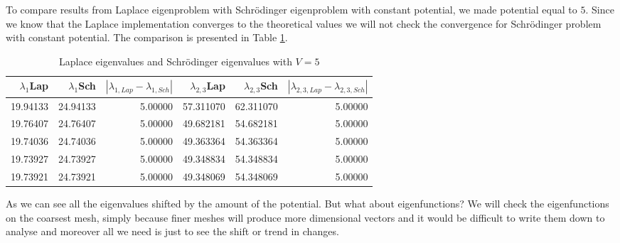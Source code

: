 \documentclass[conference]{IEEEtran}
\begin{document}
To compare results from Laplace eigenproblem with Schr\"{o}dinger eigenproblem with constant potential, we made potential equal to $5$. Since we know that the Laplace implementation converges to the theoretical values we will not check the convergence for Schr\"{o}dinger problem with constant potential.
The comparison is presented in Table \ref{tab:Laplace vs Schrod}.
\begin{table}[H]
    \centering
    \caption{Laplace eigenvalues and Schr\"{o}dinger eigenvalues with $V=5$}
    \label{tab:Laplace vs Schrod}
    \begin{tabular}{rrrrrr}
        \toprule
        $\lambda_1$Lap & $\lambda_1$Sch & $|\lambda_{1,Lap} - \lambda_{1,Sch}|$ & $\lambda_{2,3}$Lap & $\lambda_{2,3}$Sch & $|\lambda_{2,3,Lap} - \lambda_{2,3,Sch}|$ \\
        \midrule
        19.94133 & 24.94133 & 5.00000 & 57.311070 & 62.311070 & 5.00000 \\
        19.76407 & 24.76407 & 5.00000 & 49.682181 & 54.682181 & 5.00000 \\
        19.74036 & 24.74036 & 5.00000 & 49.363364 & 54.363364 & 5.00000 \\
        19.73927 & 24.73927 & 5.00000 & 49.348834 & 54.348834 & 5.00000 \\
        19.73921 & 24.73921 & 5.00000 & 49.348069 & 54.348069 & 5.00000 \\

        \bottomrule
    \end{tabular}
\end{table}

As we can see all the eigenvalues shifted by the amount of the potential. But what about eigenfunctions? We will check the eigenfunctions on the coarsest mesh, simply because finer meshes will produce more dimensional vectors and it would be difficult to write them down to analyse and moreover all we need is just to see the shift or trend in changes.
\end{document}
